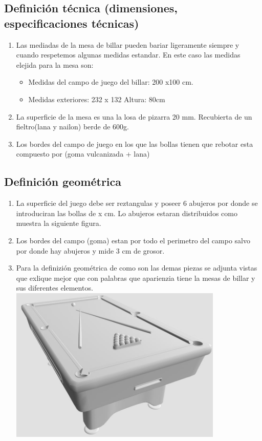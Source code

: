 	\subsection {Definición técnica (dimensiones, especificaciones técnicas)}
			\begin{enumerate}
			\item Las mediadas de la mesa de billar pueden bariar ligeramente siempre y cuando respetemos algunas medidas estandar. En este caso las medidas elejida para la mesa son:
				\begin{itemize}      
				\item Medidas del campo de juego del billar: 200 x100 cm.

				\item Medidas exteriores: 232 x 132 Altura: 80cm
				\end{itemize}
				

			\item La superficie de la mesa es una la losa de pizarra 20 mm. Recubierta de un fieltro(lana y nailon) berde de 600g.

			\item Los bordes del campo de juego en los que las bollas tienen que rebotar esta compuesto por (goma vulcanizada + lana)
			\end{enumerate}


	\subsection {Definición geométrica}
		    \begin{enumerate}
		     \item La superficie del juego debe ser reztangulas y poseer 6 abujeros por donde se introduciran las bollas de x cm. Lo  abujeros estaran distribuidos como
			    muestra la siguiente figura.
		     \item Los bordes del campo (goma) estan por todo el perimetro del campo salvo por donde hay abujeros y mide  3 cm de grosor.

		     \item Para la definizión geométrica de como son las demas piezas  se adjunta vistas que exlique mejor que con palabras que aparienzia tiene la mesas de billar
			  y sus diferentes elementos.
    			\includegraphics[width=0.8\textwidth]{prueba_billar.jpg}
			
		    \end{enumerate}


